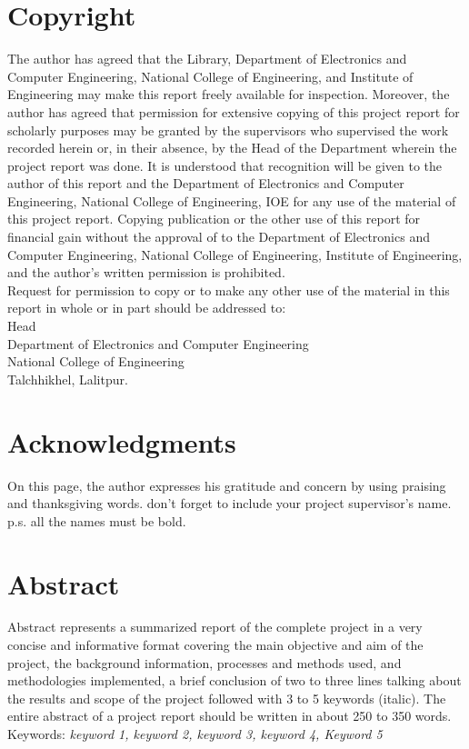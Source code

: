 \documentclass[12pt]{report}
\begin{document}
\chapter*{Copyright}
The author has agreed that the Library, Department of Electronics and Computer Engineering, National College of Engineering, and Institute of Engineering may make this report freely available for inspection. Moreover, the author has agreed that permission for extensive copying of this project report for scholarly purposes may be granted by the supervisors who supervised the work recorded herein or, in their absence, by the Head of the Department wherein the project report was done. It is understood that recognition will be given to the author of this report and the Department of Electronics and Computer Engineering, National College of Engineering, IOE for any use of the material of this project report. Copying publication or the other use of this report for financial gain without the approval of to the Department of Electronics and Computer Engineering, National College of Engineering, Institute of Engineering, and the author's written permission is prohibited.\\
Request for permission to copy or to make any other use of the material in this report in whole or in part should be addressed to:\\
\newline
\newline
\newline
Head\\
Department of Electronics and Computer Engineering\\
National College of Engineering\\
Talchhikhel, Lalitpur.
\chapter*{Acknowledgments}
On this page, the author expresses his gratitude and concern by using praising and thanksgiving words.  don’t forget to include your project supervisor's name. p.s. all the names must be bold.
\chapter*{Abstract}
Abstract represents a summarized report of the complete project in a very concise and informative format covering the main objective and aim of the project, the background information, processes and methods used, and methodologies implemented, a brief conclusion of two to three lines talking about the results and scope of the project followed with 3 to 5 keywords (italic). The entire abstract of a project report should be written in about 250 to 350 words.\\
\newline
Keywords: \textit{keyword 1, keyword 2, keyword 3, keyword 4, Keyword 5}
\tableofcontents
{}
\listoffigures
{}
\listoftables
{}
\end{document}

